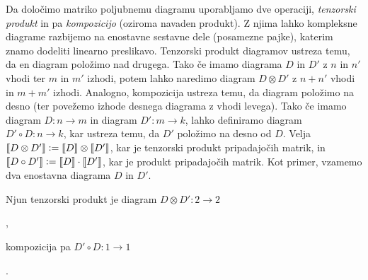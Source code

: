 \documentclass[mat1]{fmfdelo}
\newcommand{\interpret}[1]{\left\llbracket #1 \right\rrbracket}
\newcommand{\defeq}{\vcentcolon=}
\begin{document}
Da določimo matriko poljubnemu diagramu uporabljamo dve operaciji, \emph{tenzorski produkt} in pa \emph{kompozicijo} (oziroma navaden produkt). Z njima lahko kompleksne diagrame razbijemo na enostavne sestavne dele (posamezne pajke), katerim znamo dodeliti linearno preslikavo. Tenzorski produkt diagramov ustreza temu, da en diagram položimo nad drugega. Tako če imamo diagrama \(D\) in \(D'\) z \(n\) in \(n'\) vhodi ter \(m\) in \(m'\) izhodi, potem lahko naredimo diagram \(D\otimes D'\) z \(n+n'\) vhodi in \(m+m'\) izhodi. Analogno, kompozicija ustreza temu, da diagram položimo na desno (ter povežemo izhode desnega diagrama z vhodi levega). Tako če imamo diagram \(D:n\to m\) in diagram \(D':m\to k\), lahko definiramo diagram \(D'\circ D: n\to k\), kar ustreza temu, da \(D'\) položimo na desno od \(D\). Velja \(\interpret{D\otimes D'}\defeq \interpret{D} \otimes \interpret{D'}\), kar je tenzorski produkt pripadajočih matrik, in \(\interpret{D\circ D'} \defeq \interpret{D}\cdot \interpret{ D'}\), kar je produkt pripadajočih matrik. Kot primer, vzamemo dva enostavna diagrama \(D\) in \(D'\).
\begin{center}
\end{center}
Njun tenzorski produkt je diagram \(D\otimes D':2\to 2\)
\begin{center}
    ,
\end{center}
kompozicija pa \(D'\circ D: 1\to 1\)
\begin{center}
    .
\end{center}
\end{document}
